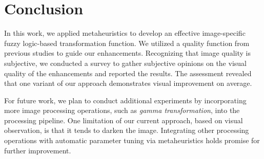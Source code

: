\section{Conclusion}
\label{section:conclusion}
In this work, we applied metaheuristics to develop an effective image-specific fuzzy logic-based transformation function. We utilized a quality function from previous studies to guide our enhancements. Recognizing that image quality is subjective, we conducted a survey to gather subjective opinions on the visual quality of the enhancements and reported the results. The assessment revealed that one variant of our approach demonstrates visual improvement on average.

For future work, we plan to conduct additional experiments by incorporating more image processing operations, such as {\em gamma transformation}, into the processing pipeline. One limitation of our current approach, based on visual observation, is that it tends to darken the image. Integrating other processing operations with automatic parameter tuning via metaheuristics holds promise for further improvement.